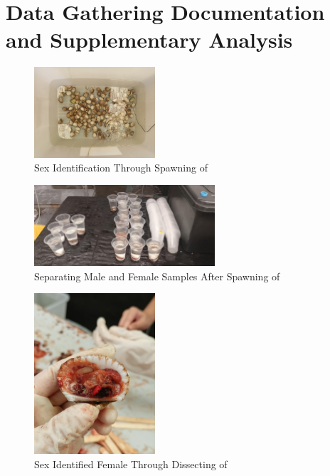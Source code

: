 %
%
%                 

\chapter{Data Gathering Documentation and Supplementary Analysis}
\label{sec:appendixa}

%

\begin{figure}[!htbp]
	\centering
	\includegraphics[width=0.4\textwidth, angle=90]{figures/spawning.jpg}
	\caption{Sex Identification Through Spawning of \Tegillarcagranosa}
\end{figure}

\begin{figure}[!htbp]
	\centering
	\includegraphics[width=0.6\textwidth]{figures/spawning_separated.jpg}
	\caption{Separating Male and Female Samples After Spawning of \Tegillarcagranosa}
\end{figure}

\begin{figure}[!htbp]
	\centering
	\includegraphics[width=0.4\textwidth, angle=90]{figures/dissecting_female.jpg}
	\caption{Sex Identified Female Through Dissecting of \Tegillarcagranosa}
\end{figure}

